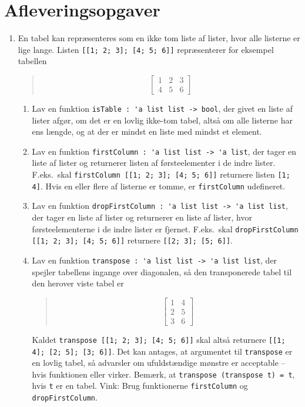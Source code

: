 \documentclass[a4paper,12pt]{article}
\begin{document}
\section*{Afleveringsopgaver}
\begin{enumerate}[label=5i.\arabic*,start=0]
\item En tabel kan repræsenteres som en ikke tom liste af lister, hvor alle listerne er lige lange. Listen \lstinline{[[1; 2; 3]; [4; 5; 6]]} repræsenterer for eksempel tabellen
  \begin{quote}
\[\left [\begin{array}{rrr}
1 & 2 & 3 \\
4 & 5 & 6
\end{array}
\right ]\]
\end{quote}
\begin{enumerate}
\item Lav en funktion \lstinline{isTable : 'a list list -> bool}, der givet en liste af lister afgør, om det er en lovlig ikke-tom tabel, altså om alle listerne har ens længde, og at der er mindst en liste med mindst et element.
\item Lav en funktion \lstinline{firstColumn : 'a list list -> 'a list}, der tager en liste af lister og returnerer listen af førsteelementer i de indre lister.  F.eks.\ skal \lstinline{firstColumn [[1; 2; 3]; [4; 5; 6]]} returnere listen \lstinline{[1; 4]}.  Hvis en eller flere af listerne er tomme, er \lstinline{firstColumn} udefineret.
\item Lav en funktion \lstinline{dropFirstColumn : 'a list list -> 'a list list}, der tager en liste af lister og returnerer en liste af lister, hvor førsteelementerne i de indre lister er fjernet.  F.eks.\ skal \lstinline{dropFirstColumn [[1; 2; 3]; [4; 5; 6]]} returnere \lstinline{[[2; 3]; [5; 6]]}.
\item Lav en funktion \lstinline{transpose : 'a list list -> 'a list list}, der spejler tabellens ingange over diagonalen, så den transponerede tabel til den herover viste tabel er
  \begin{quote}
\[\left [\begin{array}{rr}
1 & 4 \\
2 & 5 \\
3 & 6
\end{array}
\right ]\]
\end{quote}
Kaldet \lstinline{transpose [[1; 2; 3]; [4; 5; 6]]} skal altså returnere \lstinline{[[1; 4]; [2; 5]; [3; 6]]}.  Det kan antages, at argumentet til \lstinline{transpose} er en lovlig tabel, så advarsler om ufuldstændige mønstre er acceptable -- hvis funktionen eller virker.  Bemærk, at \lstinline{transpose (transpose t) = t}, hvis \lstinline{t} er en tabel.  Vink: Brug funktionerne \lstinline{firstColumn} og \lstinline{dropFirstColumn}.

\end{enumerate}
\end{enumerate}
\end{document}
